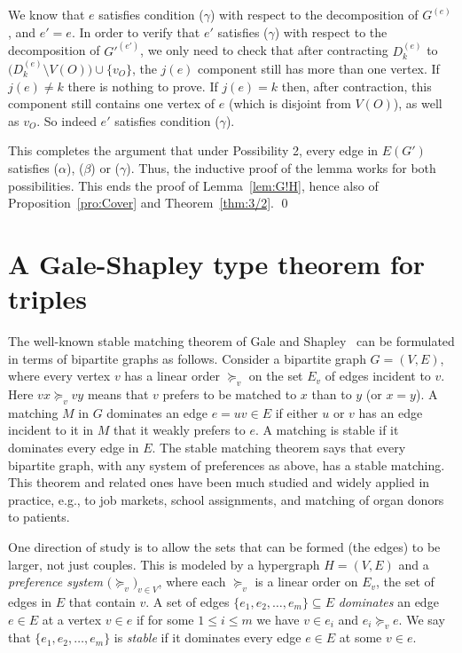\documentclass[10pt,a4paper]{amsart}
\begin{document}
We know that $e$ satisfies condition ($\gamma$) with respect to the decomposition of $G^{(e)}$, and $e' = e$. In order to verify that $e'$ satisfies ($\gamma$) with respect to the decomposition of $G'^{(e')}$, we only need to check that after contracting $D_k^{(e)}$ to $\bigl( D_k^{(e)} \setminus V(O)\bigr) \cup \{v_O\}$, the $j(e)$ component still has more than one vertex. If $j(e) \ne k$ there is nothing to prove. If $j(e) = k$ then, after contraction, this component still contains one vertex of $e$ (which is disjoint from $V(O)$), as well as $v_O$. So indeed $e'$ satisfies condition ($\gamma$).

This completes the argument that under Possibility 2, every edge in $E(G')$ satisfies ($\alpha$), ($\beta$) or ($\gamma$). Thus, the inductive proof of the lemma works for both possibilities. This ends the proof of Lemma~\ref{lem:G!H}, hence also of Proposition~\ref{pro:Cover} and Theorem~\ref{thm:3/2}. \qed

\section{A Gale-Shapley type theorem for triples}
The well-known stable matching theorem of Gale and Shapley~\cite{GS} can be formulated in terms of bipartite graphs as follows. Consider a bipartite graph $G = (V, E)$, where every vertex $v$ has a linear order $\succeq_v$ on the set $E_v$ of edges incident to $v$. Here $vx \succeq_v vy$ means that $v$ prefers to be matched to $x$ than to $y$ (or $x=y$). A matching $M$ in $G$ dominates an edge $e = uv \in E$ if either $u$ or $v$ has an edge incident to it in $M$ that it weakly prefers to $e$. A matching is stable if it dominates every edge in $E$. The stable matching theorem says that every bipartite graph, with any system of preferences as above, has a stable matching. This theorem and related ones have been much studied and widely applied in practice, e.g., to job markets, school assignments, and matching of organ donors to patients.

One direction of study is to allow the sets that can be formed (the edges) to be larger, not just couples. This is modeled by a hypergraph $H = (V, E)$ and a \emph{preference system} $\bigl( \succeq_v\bigr)_{v \in V}$, where each $\succeq_v$ is a linear order on $E_v$, the set of edges in $E$ that contain $v$. A set of edges $\{e_1, e_2, \ldots , e_m\} \subseteq E$ \emph{dominates} an edge $e \in E$ at a vertex $v \in e$ if for some $1 \le i \le m$ we have $v \in e_i$ and $e_i \succeq_v e$. We say that $\{e_1, e_2, \ldots , e_m\}$ is \emph{stable} if it dominates every edge $e \in E$ at some $v \in e$.
\end{document}

